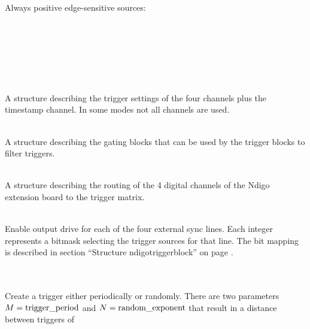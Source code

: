             \\
            \par

            Always positive edge-sensitive sources:\\
            \\
            \\
            \\
            \\
            \\
            \par

            \\
            A structure describing the trigger settings of the four channels plus the timestamp channel. In some modes not all channels are used.\par

            \\
            A structure describing the gating blocks that can be used by the trigger blocks to filter triggers.\par

            \\
            A structure describing the routing of the 4 digital channels of the Ndigo extension board to the trigger matrix.\par

            \\
            Enable output drive for each of the four external sync lines. Each integer represents a bitmask selecting the trigger sources for that line. The bit mapping is described in section ``Structure \textsf{ndigo\tu trigger\tu block}'' on page \pageref{cp:triggerblock}.\par

            \\
            \\
            Create a trigger either periodically or randomly. There are two parameters $M = \text{trigger\textunderscore period}$ and $N = \text{random\textunderscore exponent}$ that result in a distance between triggers of

